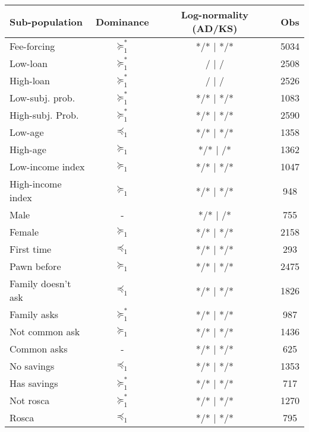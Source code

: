 \begin{tabular}{lccc}
\toprule
Sub-population & Dominance & Log-normality (AD/KS) & Obs \\
\midrule
\midrule
Fee-forcing & \cellcolor[rgb]{ .557,  .663,  .859} $\succeq_{1}^*$ & */*  |  */* & 5034 \\
Low-loan & $\succeq_{1}^*$ &    /     |     /    & 2508 \\
High-loan & $\succeq_{1}^*$ &    /     |     /    & 2526 \\
Low-subj. prob. & \cellcolor[rgb]{ .557,  .663,  .859} $\succeq_{1}^*$ & */*  |  */* & 1083 \\
High-subj. Prob. & \cellcolor[rgb]{ .557,  .663,  .859} $\succeq_{1}^*$ & */*  |  */* & 2590 \\
Low-age & $\preceq_{1}$ & */*  |  */* & 1358 \\
High-age & \cellcolor[rgb]{ .851,  .882,  .949} $\succeq_{1}$ & */*  |     /* & 1362 \\
Low-income index & \cellcolor[rgb]{ .851,  .882,  .949} $\succeq_{1}$ & */*  |  */* & 1047 \\
High-income index & \cellcolor[rgb]{ .851,  .882,  .949} $\succeq_{1}$ & */*  |  */* & 948 \\
Male  & -     & */*  |     /* & 755 \\
Female & \cellcolor[rgb]{ .851,  .882,  .949} $\succeq_{1}$ & */*  |  */* & 2158 \\
First time & $\preceq_{1}$ & */*  |  */* & 293 \\
Pawn before & \cellcolor[rgb]{ .851,  .882,  .949} $\succeq_{1}$ & */*  |  */* & 2475 \\
Family doesn't ask & $\preceq_{1}$ & */*  |  */* & 1826 \\
Family asks & \cellcolor[rgb]{ .557,  .663,  .859} $\succeq_{1}^*$ & */*  |  */* & 987 \\
Not common ask & \cellcolor[rgb]{ .851,  .882,  .949} $\succeq_{1}$ & */*  |  */* & 1436 \\
Common asks & -     & */*  |  */* & 625 \\
No savings & $\preceq_{1}$ & */*  |  */* & 1353 \\
Has savings & \cellcolor[rgb]{ .557,  .663,  .859} $\succeq_{1}^*$ & */*  |  */* & 717 \\
Not rosca & \cellcolor[rgb]{ .557,  .663,  .859} $\succeq_{1}^*$ & */*  |  */* & 1270 \\
Rosca & $\preceq_{1}$ & */*  |  */* & 795 \\

\end{tabular}
